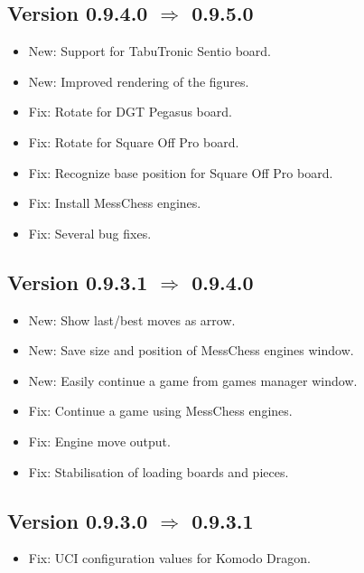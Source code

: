 \documentclass[11pt,a4paper]{article}
\begin{document}
\subsection*{Version 0.9.4.0 $\Rightarrow$  0.9.5.0}
\begin{itemize}
	\item {\color{blue}New}: Support for TabuTronic Sentio board.
	\item {\color{blue}New}: Improved rendering of the figures.
    \item {\color{red}Fix}: Rotate for DGT Pegasus board.
    \item {\color{red}Fix}: Rotate for Square Off Pro board.    
    \item {\color{red}Fix}: Recognize base position for Square Off Pro board.        
	\item {\color{red}Fix}: Install MessChess engines.
	\item {\color{red}Fix}: Several bug fixes.
\end{itemize}

\subsection*{Version 0.9.3.1 $\Rightarrow$  0.9.4.0}
\begin{itemize}
	\item {\color{blue}New}: Show last/best moves as arrow.
	\item {\color{blue}New}: Save size and position of MessChess engines window.	
	\item {\color{blue}New}: Easily continue a game from games manager window.		
	\item {\color{red}Fix}: Continue a game using MessChess engines.
    \item {\color{red}Fix}: Engine move output.
    \item {\color{red}Fix}: Stabilisation of loading boards and pieces.
\end{itemize}

\subsection*{Version 0.9.3.0 $\Rightarrow$  0.9.3.1}
\begin{itemize}
	\item {\color{red}Fix}: UCI configuration values for Komodo Dragon.
\end{itemize}
\end{document}

